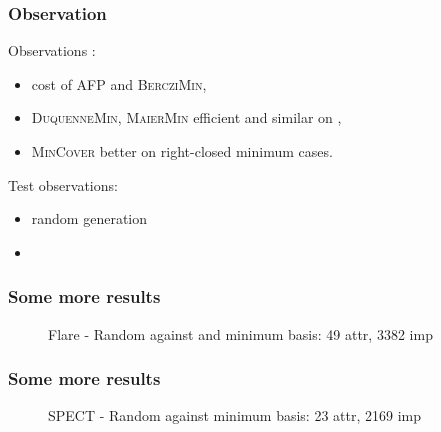 \begin{frame}
\frametitle{Observation}

Observations :
\begin{itemize}
	\item cost of \textsc{AFP} and \textsc{BercziMin},
	\item \textsc{DuquenneMin}, \textsc{MaierMin} efficient and similar on ,
	\item \textsc{MinCover} better on right-closed minimum cases.
\end{itemize}

\vspace{1.2em}

Test observations:
\begin{itemize}
	\item random generation
	\item 
\end{itemize}

\end{frame}

\begin{frame}
\frametitle{Some more results}

\vspace{-1.5em}

\begin{figure}
	\centering
\scalebox{0.5}{}

\caption{Flare - Random against and minimum basis: 49 attr, 3382 imp}
\label{fig:barplot-flare}
\end{figure}

\end{frame}

\begin{frame}
\frametitle{Some more results}

\vspace{-1.5em}

\begin{figure}
	\centering
	\scalebox{0.5}{}
	
	\caption{SPECT - Random against minimum basis: 23 attr, 2169 imp}
	\label{fig:barplot-spect}
\end{figure}

\end{frame}

